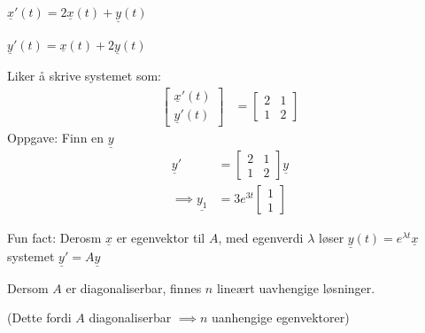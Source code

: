 \documentclass[11pt, a4paper, norsk]{article}
\begin{document}
            \begin{Example}{}{}
                $\underline{x}'(t) = 2\underline{x}(t) + \underline{y}(t)$
                    \\
                    \\
                $\underline{y}'(t) = \underline{x}(t) + 2\underline{y}(t)$

                Liker å skrive systemet som:
                \begin{align*}
                    \begin{bmatrix}
                    \underline{x}'(t) \\
                        \underline{y}'(t)
                    \end{bmatrix} &= \begin{bmatrix}
                    2 & 1 \\
                    1 & 2
                    \end{bmatrix}
                \end{align*}
                Oppgave: Finn en $\underline{y}$
                \begin{align*}
                    \underline{y}' &= \begin{bmatrix}
                        2 & 1 \\
                        1 & 2
                    \end{bmatrix}\underline{y}
                    \\
                        \implies \underline{y_1} &= 3e^{3t}\begin{bmatrix}
                                       1 \\
                                       1
                                   \end{bmatrix}
                \end{align*}
                
                Fun fact: Derosm $\underline{x}$ er egenvektor til $A$, med egenverdi $\lambda$ løser $\underline{y}(t) = e^{\lambda t}\underline{x}$ systemet $\underline{y}' = A\underline{y}$
            \end{Example}

            \begin{Theorem}{}{}
                Dersom $A$ er diagonaliserbar, finnes $n$ lineært uavhengige løsninger. 

                (Dette fordi $A$ diagonaliserbar $\implies n$ uanhengige egenvektorer)
            \end{Theorem}
\end{document}
